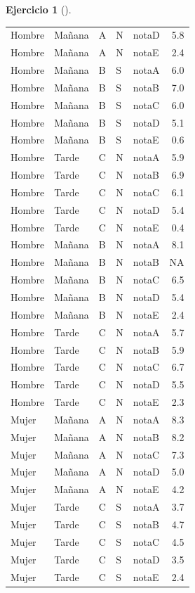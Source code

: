 \documentclass[
  a4paper,
]{scrreport}
\theoremstyle{definition}
\newtheorem{exercise}{Ejercicio}[chapter]
\theoremstyle{remark}
\begin{document}
\begin{exercise}[]
\begin{enumerate}
\begin{tcolorbox}
\begin{longtable}[]{@{}lllllr@{}}
  Hombre & Mañana & A & N & notaD & 5.8 \\
  Hombre & Mañana & A & N & notaE & 2.4 \\
  Hombre & Mañana & B & S & notaA & 6.0 \\
  Hombre & Mañana & B & S & notaB & 7.0 \\
  Hombre & Mañana & B & S & notaC & 6.0 \\
  Hombre & Mañana & B & S & notaD & 5.1 \\
  Hombre & Mañana & B & S & notaE & 0.6 \\
  Hombre & Tarde & C & N & notaA & 5.9 \\
  Hombre & Tarde & C & N & notaB & 6.9 \\
  Hombre & Tarde & C & N & notaC & 6.1 \\
  Hombre & Tarde & C & N & notaD & 5.4 \\
  Hombre & Tarde & C & N & notaE & 0.4 \\
  Hombre & Mañana & B & N & notaA & 8.1 \\
  Hombre & Mañana & B & N & notaB & NA \\
  Hombre & Mañana & B & N & notaC & 6.5 \\
  Hombre & Mañana & B & N & notaD & 5.4 \\
  Hombre & Mañana & B & N & notaE & 2.4 \\
  Hombre & Tarde & C & N & notaA & 5.7 \\
  Hombre & Tarde & C & N & notaB & 5.9 \\
  Hombre & Tarde & C & N & notaC & 6.7 \\
  Hombre & Tarde & C & N & notaD & 5.5 \\
  Hombre & Tarde & C & N & notaE & 2.3 \\
  Mujer & Mañana & A & N & notaA & 8.3 \\
  Mujer & Mañana & A & N & notaB & 8.2 \\
  Mujer & Mañana & A & N & notaC & 7.3 \\
  Mujer & Mañana & A & N & notaD & 5.0 \\
  Mujer & Mañana & A & N & notaE & 4.2 \\
  Mujer & Tarde & C & S & notaA & 3.7 \\
  Mujer & Tarde & C & S & notaB & 4.7 \\
  Mujer & Tarde & C & S & notaC & 4.5 \\
  Mujer & Tarde & C & S & notaD & 3.5 \\
  Mujer & Tarde & C & S & notaE & 2.4 \\

\end{longtable}
\end{tcolorbox}
\end{enumerate}
\end{exercise}
\end{document}

